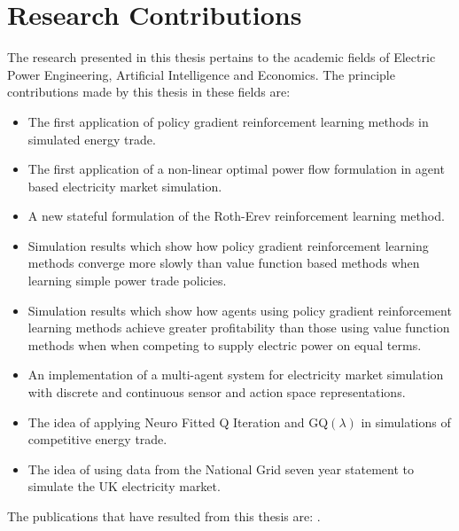 \section{Research Contributions}
The research presented in this thesis pertains to the academic fields of
Electric Power Engineering, Artificial Intelligence and Economics.  The
principle contributions made by this thesis in these fields are:
\begin{itemize}
  \item The first application of policy gradient reinforcement learning methods
  in simulated energy trade.
  \item The first application of a non-linear optimal power flow formulation in
  agent based electricity market simulation.
  \item A new stateful formulation of the Roth-Erev reinforcement learning
  method.
  \item Simulation results which show how policy gradient reinforcement
  learning methods converge more slowly than value function based methods when learning
  simple power trade policies.
  \item Simulation results which show how agents using policy gradient
  reinforcement learning methods achieve greater profitability than those
  using value function methods when when competing to supply electric power on
  equal terms.
  \item An implementation of a multi-agent system for electricity market
  simulation with discrete and continuous sensor and action space
  representations.
  \item The idea of applying Neuro Fitted Q Iteration and GQ$(\lambda)$ in
  simulations of competitive energy trade.
  \item The idea of using data from the National Grid seven year statement to
  simulate the UK electricity market.
\end{itemize}
The publications that have resulted from this thesis are:
.

